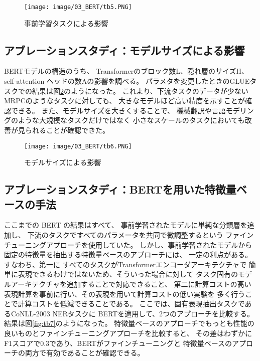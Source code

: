 \documentclass{jsarticle}
\begin{document}
\begin{figure}[H]
  \begin{center}
    \texttt{[image: image/03\_BERT/tb5.PNG]}
    \caption{事前学習タスクによる影響}
    \label{fig:tb5}
  \end{center}
\end{figure}

\subsection{アブレーションスタディ：モデルサイズによる影響}
BERTモデルの構造のうち、
Transformerのブロック数L、隠れ層のサイズH、self-attention ヘッドの数Aの影響を調べる。
パラメタを変更したときのGLUEタスクでの結果は図\ref{fig:tb6}のようになった。
これより、下流タスクのデータが少ないMRPCのようなタスクに対しても、
大きなモデルほど高い精度を示すことが確認できる。
また、モデルサイズを大きくすることで、
機械翻訳や言語モデリングのような大規模なタスクだけではなく
小さなスケールのタスクにおいても改善が見られることが確認できた。

\begin{figure}[H]
  \begin{center}
    \texttt{[image: image/03\_BERT/tb6.PNG]}
    \caption{モデルサイズによる影響}
    \label{fig:tb6}
  \end{center}
\end{figure}


\subsection{アブレーションスタディ：BERTを用いた特徴量ベースの手法}
ここまでの BERT の結果はすべて、
事前学習されたモデルに単純な分類層を追加し、
下流のタスクですべてのパラメータを共同で微調整するという
ファインチューニングアプローチを使用していた。
しかし、事前学習されたモデルから固定の特徴量を抽出する特徴量ベースのアプローチには、
一定の利点がある。
すなわち、第一に
すべてのタスクがTransformerエンコーダアーキテクチャで
簡単に表現できるわけではないため、そういった場合に対して
タスク固有のモデルアーキテクチャを追加することで対応できること、
第二に計算コストの高い表現計算を事前に行い、その表現を用いて計算コストの低い実験を
多く行うことで計算コストを低減できることである。
ここでは、固有表現抽出タスクであるCoNLL-2003 NERタスクに
BERTを適用して、2つのアプローチを比較する。
結果は図\ref{fig:tb7}のようになった。
特徴量ベースのアプローチでもっとも性能の良いものとファインチューニングアプローチを比較すると、
その差はわずかにF1スコアで0.3であり、BERTがファインチューニングと
特徴量ベースのアプローチの両方で有効であることが確認できる。
\end{document}
